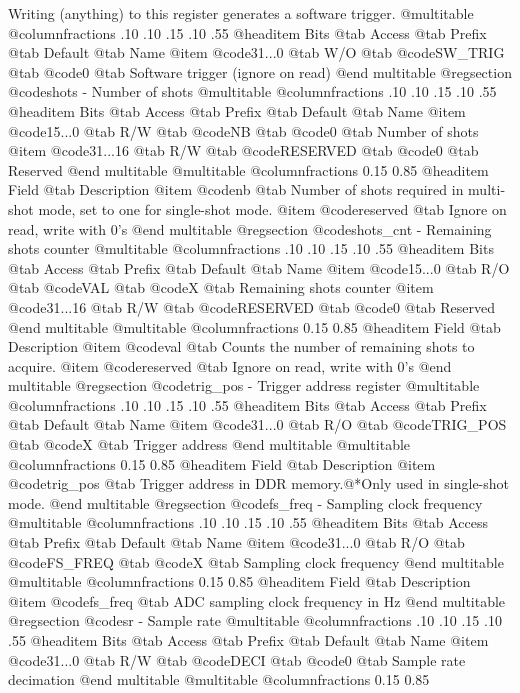 Writing (anything) to this register generates a software trigger.
@multitable @columnfractions .10 .10 .15 .10 .55
@headitem Bits @tab Access @tab Prefix @tab Default @tab Name
@item @code{31...0}
@tab W/O @tab
@code{SW_TRIG}
@tab @code{0} @tab 
Software trigger (ignore on read)
@end multitable
@regsection @code{shots} - Number of shots
@multitable @columnfractions .10 .10 .15 .10 .55
@headitem Bits @tab Access @tab Prefix @tab Default @tab Name
@item @code{15...0}
@tab R/W @tab
@code{NB}
@tab @code{0} @tab 
Number of shots
@item @code{31...16}
@tab R/W @tab
@code{RESERVED}
@tab @code{0} @tab 
Reserved
@end multitable
@multitable @columnfractions 0.15 0.85
@headitem Field @tab Description
@item @code{nb} @tab Number of shots required in multi-shot mode, set to one for single-shot mode.
@item @code{reserved} @tab Ignore on read, write with 0's
@end multitable
@regsection @code{shots_cnt} - Remaining shots counter
@multitable @columnfractions .10 .10 .15 .10 .55
@headitem Bits @tab Access @tab Prefix @tab Default @tab Name
@item @code{15...0}
@tab R/O @tab
@code{VAL}
@tab @code{X} @tab 
Remaining shots counter
@item @code{31...16}
@tab R/W @tab
@code{RESERVED}
@tab @code{0} @tab 
Reserved
@end multitable
@multitable @columnfractions 0.15 0.85
@headitem Field @tab Description
@item @code{val} @tab Counts the number of remaining shots to acquire.
@item @code{reserved} @tab Ignore on read, write with 0's
@end multitable
@regsection @code{trig_pos} - Trigger address register
@multitable @columnfractions .10 .10 .15 .10 .55
@headitem Bits @tab Access @tab Prefix @tab Default @tab Name
@item @code{31...0}
@tab R/O @tab
@code{TRIG_POS}
@tab @code{X} @tab 
Trigger address
@end multitable
@multitable @columnfractions 0.15 0.85
@headitem Field @tab Description
@item @code{trig_pos} @tab Trigger address in DDR memory.@*Only used in single-shot mode.
@end multitable
@regsection @code{fs_freq} - Sampling clock frequency
@multitable @columnfractions .10 .10 .15 .10 .55
@headitem Bits @tab Access @tab Prefix @tab Default @tab Name
@item @code{31...0}
@tab R/O @tab
@code{FS_FREQ}
@tab @code{X} @tab 
Sampling clock frequency
@end multitable
@multitable @columnfractions 0.15 0.85
@headitem Field @tab Description
@item @code{fs_freq} @tab ADC sampling clock frequency in Hz
@end multitable
@regsection @code{sr} - Sample rate
@multitable @columnfractions .10 .10 .15 .10 .55
@headitem Bits @tab Access @tab Prefix @tab Default @tab Name
@item @code{31...0}
@tab R/W @tab
@code{DECI}
@tab @code{0} @tab 
Sample rate decimation
@end multitable
@multitable @columnfractions 0.15 0.85
